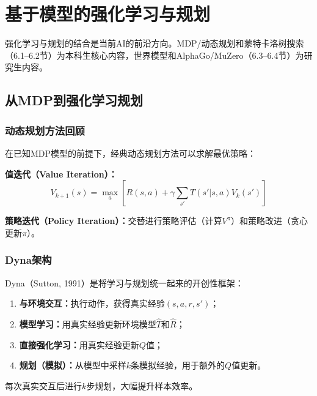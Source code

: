 \chapter{基于模型的强化学习与规划}

\begin{levelbox}
强化学习与规划的结合是当前AI的前沿方向。MDP/动态规划和蒙特卡洛树搜索（6.1--6.2节）为本科生核心内容，世界模型和AlphaGo/MuZero（6.3--6.4节）为研究生内容。
\end{levelbox}

\section{从MDP到强化学习规划 \ug}

\subsection{动态规划方法回顾}

在已知MDP模型的前提下，经典动态规划方法可以求解最优策略：

\textbf{值迭代（Value Iteration）：}
$$V_{k+1}(s) = \max_a \left[ R(s,a) + \gamma \sum_{s'} T(s'|s,a) V_k(s') \right]$$

\textbf{策略迭代（Policy Iteration）：}交替进行策略评估（计算$V^\pi$）和策略改进（贪心更新$\pi$）。

\subsection{Dyna架构 \ug}

Dyna（Sutton, 1991）是将学习与规划统一起来的开创性框架：

\begin{algbox}[title={\textbf{Dyna-Q核心思想}}]
\begin{enumerate}
  \item \textbf{与环境交互：}执行动作，获得真实经验$(s, a, r, s')$；
  \item \textbf{模型学习：}用真实经验更新环境模型$\hat{T}$和$\hat{R}$；
  \item \textbf{直接强化学习：}用真实经验更新$Q$值；
  \item \textbf{规划（模拟）：}从模型中采样$k$条模拟经验，用于额外的$Q$值更新。
\end{enumerate}
每次真实交互后进行$k$步规划，大幅提升样本效率。
\end{algbox}

